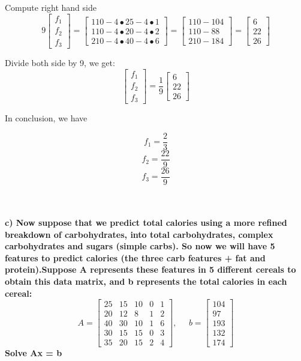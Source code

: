 \documentclass[paper=a4, fontsize=11pt]{scrartcl} %
\numberwithin{equation}{section} %
\numberwithin{figure}{section} %
\numberwithin{table}{section} %
\begin{document}
Compute right hand side 
$$
9
\begin{bmatrix}
f_1 \\
f_2 \\
f_3
\end{bmatrix}
=
\begin{bmatrix}
110 - 4 \bullet 25 - 4 \bullet 1 \\
110 - 4 \bullet 20 - 4 \bullet 2 \\
210 - 4 \bullet 40 - 4 \bullet 6 
\end{bmatrix}
= 
\begin{bmatrix}
110 - 104 \\
110 - 88 \\
210 - 184
\end{bmatrix}
=
\begin{bmatrix}
6 \\
22 \\
26
\end{bmatrix}
$$

Divide both side by 9, we get: 
$$
\begin{bmatrix}
f_1 \\
f_2 \\
f_3
\end{bmatrix}
=
\frac{1}{9}
\begin{bmatrix}
6 \\
22 \\
26
\end{bmatrix}
$$

In conclusion, we have 

$$
f_1 =  \frac{2}{3} 
$$$$
f_2 =  \frac{22}{9} 
$$$$
f_3 =  \frac{26}{9}
$$\\\\

\newpage

\textbf{c) Now suppose that we predict total calories using a more refined breakdown of carbohydrates, into total carbohydrates, complex carbohydrates and sugars (simple carbs). So now we will have 5 features to predict calories (the three carb features + fat and protein).Suppose A represents these features in 5 different cereals to obtain this data matrix, and b represents the total calories in each cereal:} 
$$
A = 
\begin{bmatrix}
25 & 15 & 10 & 0 & 1  \\
20 & 12 & 8 & 1 & 2   \\
40 & 30 & 10 & 1 & 6  \\
30 & 15 & 15 & 0 & 3  \\
35 & 20 & 15 & 2 & 4 
\end{bmatrix}, 
\;\;\;\;\;
b =
\begin{bmatrix}
104	\\
97	\\
193 \\
132 \\
174
\end{bmatrix}
$$
\textbf{Solve Ax = b}
\end{document}
